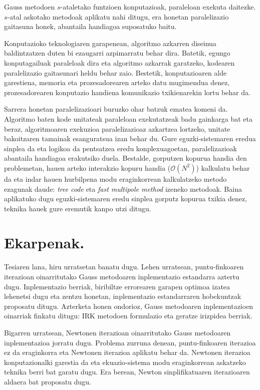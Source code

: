 Gauss metodoen $s$-ataletako funtzioen konputazioak, paraleloan exekuta daitezke. $s$-atal askotako metodoak aplikatu nahi ditugu, era honetan paralelizazio gaitasuna honek, abantaila handiagoa suposatuko baitu.

Konputazioko teknologiaren garapenean, algoritmo azkarren diseinua baldintzatzen duten bi ezaugarri azpimarratu behar dira. Batetik, egungo konputagailuak paraleloak dira eta algoritmo azkarrak garatzeko, kodearen paralelizazio gaitasunari heldu behar zaio. Bestetik, konputazioaren alde garestiena, memoria eta prozesadorearen arteko datu mugimendua denez, prozesadorearen konputazio handiena komunikazio txikienarekin lortu behar da.  

Sarrera honetan paralelizazioari buruzko ohar batzuk ematea komeni da. Algoritmo baten kode unitateak paraleloan exekutatzeak badu gainkarga bat eta beraz,  algoritmoaren exekuzioa paralelizazioaz azkartzea lortzeko,  unitate bakoitzaren tamainak esanguratsua izan behar du. Gure eguzki-sistemaren eredua sinplea da eta logikoa da pentsatzea eredu konplexuagoetan, paralelizazioak abantaila handiagoa erakutsiko duela. Bestalde, gorputzen kopurua handia den problemetan, hauen arteko interakzio kopuru  handia ($\mathcal{O}(N^2)$) kalkulatu behar da  eta indar hauen hurbilpena modu eraginkorrean kalkulatzeko metodo ezagunak daude: \textit {tree code}\cite{Barnes1986} eta \textit {fast multipole method}\cite{Carrier1988} izeneko metodoak. Baina aplikatuko dugu eguzki-sistemaren eredu sinplea  gorputz kopurua txikia denez, teknika hauek gure eremutik kanpo utzi ditugu. 


\section{Ekarpenak.}


Tesiaren lana, hiru urratsetan banatu dugu. Lehen urratsean, puntu-finkoaren iterazioan oinarritutako Gauss metodoaren inplementazio estandarra aztertu dugu. Inplementazio berriak, biribiltze errorearen garapen optimoa izatea lehenetsi dugu eta zentzu honetan, inplementazio estandarraren hobekuntzak proposatu ditugu. Azterketa honen ondorioz, Gauss metodoaren inplementazioen oinarriak finkatu ditugu: IRK metodoen formulazio eta geratze irizpidea berriak.

Bigarren urratsean, Newtonen iterazioan oinarritutako Gauss metodoaren inplementazioa jorratu dugu. Problema zurruna denean, puntu-finkoaren iterazioa ez da eraginkorra eta Newtonen iterazioa aplikatu behar da. Newtonen iterazioa konputazionalki garestia da eta ekuazio-sistema modu eraginkorrean askatzeko teknika berri bat garatu dugu. Era berean, Newton sinplifikatuaren iterazioaren aldaera bat proposatu dugu. 


